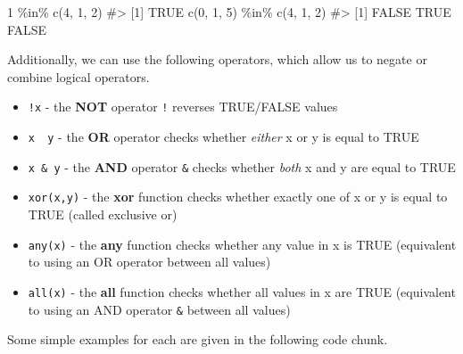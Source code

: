 \documentclass[
  letterpaper,
]{latex/krantz}
\makeatletter
\newenvironment{Shaded}{\begin{snugshade}}{\end{snugshade}}
\newcommand{\CommentTok}[1]{\textcolor[rgb]{0.37,0.37,0.37}{#1}}
\newcommand{\DecValTok}[1]{\textcolor[rgb]{0.68,0.00,0.00}{#1}}
\newcommand{\FunctionTok}[1]{\textcolor[rgb]{0.28,0.35,0.67}{#1}}
\newcommand{\NormalTok}[1]{\textcolor[rgb]{0.00,0.23,0.31}{#1}}
\newcommand{\SpecialCharTok}[1]{\textcolor[rgb]{0.37,0.37,0.37}{#1}}
\providecommand{\tightlist}{%
  \setlength{\itemsep}{0pt}\setlength{\parskip}{0pt}}\usepackage{longtable,booktabs,array}
\newenvironment{kframe}{%
\medskip{}
\setlength{\fboxsep}{.8em}
 \def\at@end@of@kframe{}%
 \ifinner\ifhmode%
  \def\at@end@of@kframe{\end{minipage}}%
  \begin{minipage}{\columnwidth}%
 \fi\fi%
 \def\FrameCommand##1{\hskip\@totalleftmargin \hskip-\fboxsep
 \colorbox{shadecolor}{##1}\hskip-\fboxsep
     \hskip-\linewidth \hskip-\@totalleftmargin \hskip\columnwidth}%
 \MakeFramed {\advance\hsize-\width
   \@totalleftmargin\z@ \linewidth\hsize
   \@setminipage}}%
 {\par\unskip\endMakeFramed%
 \at@end@of@kframe}
\renewenvironment{Shaded}{\begin{kframe}}{\end{kframe}}
\makeatother
\begin{document}
\begin{Shaded}
\begin{Highlighting}[]
\DecValTok{1} \SpecialCharTok{\%in\%} \FunctionTok{c}\NormalTok{(}\DecValTok{4}\NormalTok{, }\DecValTok{1}\NormalTok{, }\DecValTok{2}\NormalTok{)}
\CommentTok{\#\textgreater{} [1] TRUE}
\FunctionTok{c}\NormalTok{(}\DecValTok{0}\NormalTok{, }\DecValTok{1}\NormalTok{, }\DecValTok{5}\NormalTok{) }\SpecialCharTok{\%in\%} \FunctionTok{c}\NormalTok{(}\DecValTok{4}\NormalTok{, }\DecValTok{1}\NormalTok{, }\DecValTok{2}\NormalTok{)}
\CommentTok{\#\textgreater{} [1] FALSE  TRUE FALSE}
\end{Highlighting}
\end{Shaded}

Additionally, we can use the following operators, which allow us to
negate or combine logical operators.

\begin{itemize}
\tightlist
\item
  \texttt{!x} - the \textbf{NOT} operator \texttt{!} reverses TRUE/FALSE
  values
\item
  \texttt{x\ \textbar{}\ y} - the \textbf{OR} operator
  \texttt{\textbar{}} checks whether \emph{either} x or y is equal to
  TRUE
\item
  \texttt{x\ \&\ y} - the \textbf{AND} operator \texttt{\&} checks
  whether \emph{both} x and y are equal to TRUE
\item
  \texttt{xor(x,y)} - the \textbf{xor} function checks whether exactly
  one of x or y is equal to TRUE (called exclusive or)
\item
  \texttt{any(x)} - the \textbf{any} function checks whether any value
  in x is TRUE (equivalent to using an OR operator \texttt{\textbar{}}
  between all values) 
\item
  \texttt{all(x)} - the \textbf{all} function checks whether all values
  in x are TRUE (equivalent to using an AND operator \texttt{\&} between
  all values) 
\end{itemize}

Some simple examples for each are given in the following code chunk.
\end{document}
